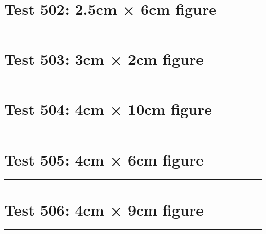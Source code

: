 \documentclass[a4paper,11pt]{article}
\begin{document}
\section*{Test 502: 2.5cm × 6cm figure}
\begin{swarmwrap}%
  \begin{minipage}[t]{2cm}
    \centering
    \rule{\linewidth}{6cm}
  \end{minipage}%
\end{swarmwrap}%
\swarmwrapnext
\lipsum[105]
\lipsum[106]
\lipsum[107]
\lipsum[108]
\lipsum[109]
\section*{Test 503: 3cm × 2cm figure}
\begin{swarmwrap}%
  \begin{minipage}[t]{3cm}
    \centering
    \rule{\linewidth}{2cm}
  \end{minipage}%
\end{swarmwrap}%
\swarmwrapnext
\lipsum[15]
\lipsum[16]
\lipsum[17]
\lipsum[18]
\lipsum[19]
\lipsum[20]
\section*{Test 504: 4cm × 10cm figure}
\begin{swarmwrap}%
  \begin{minipage}[t]{4cm}
    \centering
    \rule{\linewidth}{10cm}
  \end{minipage}%
\end{swarmwrap}%
\swarmwrapnext
\lipsum[94]
\lipsum[95]
\lipsum[96]
\lipsum[97]
\section*{Test 505: 4cm × 6cm figure}
\begin{swarmwrap}%
  \begin{minipage}[t]{4cm}
    \centering
    \rule{\linewidth}{6cm}
  \end{minipage}%
\end{swarmwrap}%
\swarmwrapnext
\lipsum[100]
\lipsum[101]
\lipsum[102]
\section*{Test 506: 4cm × 9cm figure}
\begin{swarmwrap}%
  \begin{minipage}[t]{4cm}
    \centering
    \rule{\linewidth}{9cm}
  \end{minipage}%
\end{swarmwrap}%
\swarmwrapnext
\lipsum[32]
\lipsum[33]
\lipsum[34]
\lipsum[35]
\lipsum[36]
\end{document}
